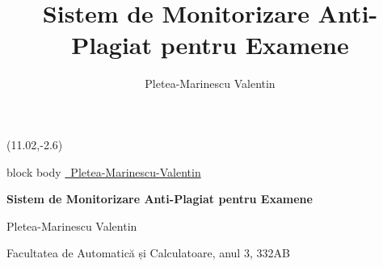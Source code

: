 \documentclass[aspectratio=169,9pt]{beamer}
\title{Sistem de Monitorizare Anti-Plagiat pentru Examene}
\author{Pletea-Marinescu Valentin}
\date{}
\begin{document}
\begin{frame}
    
    \begin{textblock}{4.05}(11.02,-2.6)
        \begin{beamercolorbox}[rounded=true,shadow=false,sep=0.1em]{block body}
            \href{https://github.com/Pletea-Marinescu-Valentin}{\color{black}\faGithub\ Pletea-Marinescu-Valentin}
        \end{beamercolorbox}
    \end{textblock}
    
    \begin{center}
        \vspace{1cm}
        {\Huge\color{white}\textbf{Sistem de Monitorizare Anti-Plagiat pentru Examene}}
        
        \vspace{1cm}
        
        \vspace{0.5cm}
        {\large\color{white}Pletea-Marinescu Valentin}
        
        \vspace{0.3cm}
        {\color{white}Facultatea de Automatică și Calculatoare, anul 3, 332AB}
    \end{center}
\end{frame}
\end{document}
